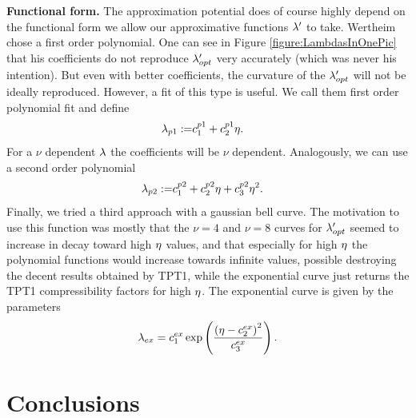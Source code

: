 \documentclass[8.5pt,twoside,twocolumn]{article}
\theoremstyle{standard}
\begin{document}
\textbf{Functional form.} The approximation potential does of course highly depend on
the functional form we allow our approximative functions $\lambda'$ to take. Wertheim
chose a first order polynomial. One can see in Figure \ref{figure:LambdasInOnePic}
that his coefficients do not reproduce $\lambda_{opt}'$ very accurately (which was never
his intention). But even with better coefficients, the curvature of the
$\lambda_{opt}'$ will not be ideally reproduced. However, a fit of this type is useful.
We call them first order polynomial fit and define
\newcommand\po{{p1}}
\newcommand\lanupo{\la_{\tilde \nu,p1}}
\begin{equation}
\begin{aligned}
\la_\po:=&c_1^\po+c_2^\po\e.%
\end{aligned}
\label{TPT:la:p1}
\end{equation}
For a $\nu$ dependent $\lambda$ the coefficients will be $\nu$ dependent.
Analogously, we can use a second order polynomial
\newcommand\pt{{p2}}
\newcommand\lanupt{\la_{\tilde \nu,p2}}
\begin{equation}
\begin{aligned}
\la_\pt:=&c_1^\pt+c_2^\pt\e+c_3^\pt\e^2.%
\end{aligned}
\label{TPT:la:p2}
\end{equation}
Finally, we tried a third approach with a gaussian
bell curve. The motivation to use this function was mostly that the
$\nu=4$ and $\nu=8$ curves for $\lambda_{opt}'$ seemed to increase in decay toward high
$\eta$ values, and that especially for high $\eta$ the polynomial functions
would increase towards infinite values, possible destroying the decent
results obtained by TPT1, while the exponential curve just returns
the TPT1 compressibility factors for high $\eta$. The exponential curve
is given by the parameters
\newcommand\ex{{ex}}
\begin{equation}
\la_\ex=c_1^\ex \exp\rb{\frac {\rb{\e-c_2^\ex}^2}{c_3^\ex}}.
\label{TPT:la:ex}
\end{equation} 



\section{Conclusions}
\label{Con}
\end{document}
